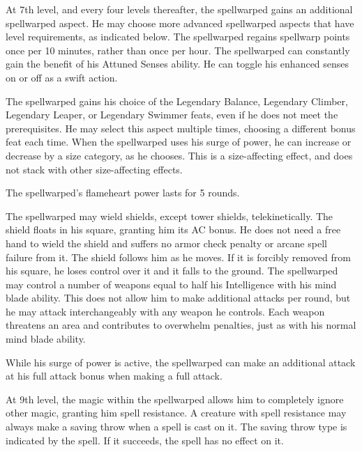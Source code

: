  At 7th level, and every four levels thereafter, the spellwarped gains an additional spellwarped aspect. He may choose more advanced spellwarped aspects that have level requirements, as indicated below.
 The spellwarped regains spellwarp points once per 10 minutes, rather than once per hour.
 The spellwarped can constantly gain the benefit of his Attuned Senses ability. He can toggle his enhanced senses on or off as a swift action.

 The spellwarped gains his choice of the Legendary Balance, Legendary Climber, Legendary Leaper, or Legendary Swimmer feats, even if he does not meet the prerequisites. He may select this aspect multiple times, choosing a different bonus feat each time.
 When the spellwarped uses his surge of power, he can increase or decrease by a size category, as he chooses. This is a size-affecting effect, and does not stack with other size-affecting effects.

 The spellwarped's flameheart power lasts for 5 rounds.

 The spellwarped may wield shields, except tower shields, telekinetically. The shield floats in his square, granting him its AC bonus. He does not need a free hand to wield the shield and suffers no armor check penalty or arcane spell failure from it. The shield follows him as he moves. If it is forcibly removed from his square, he loses control over it and it falls to the ground.
 The spellwarped may control a number of weapons equal to half his Intelligence with his mind blade ability. This does not allow him to make additional attacks per round, but he may attack interchangeably with any weapon he controls. Each weapon threatens an area and contributes to overwhelm penalties, just as with his normal mind blade ability.

 While his surge of power is active, the spellwarped can make an additional attack at his full attack bonus when making a full attack.

 At 9th level, the magic within the spellwarped allows him to completely ignore other magic, granting him spell resistance. A creature with spell resistance may always make a saving throw when a spell is cast on it. The saving throw type is indicated by the spell. If it succeeds, the spell has no effect on it.

